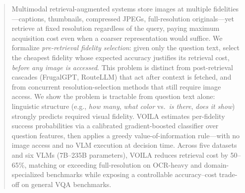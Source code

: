 \begin{abstract}
Multimodal retrieval-augmented systems store images at multiple fidelities---captions, thumbnails, compressed JPEGs, full-resolution originals---yet retrieve at fixed resolution regardless of the query, paying maximum acquisition cost even when a coarser representation would suffice.
We formalize \emph{pre-retrieval fidelity selection}: given only the question text, select the cheapest fidelity whose expected accuracy justifies its retrieval cost, \emph{before any image is accessed}.
This problem is distinct from post-retrieval cascades (FrugalGPT, RouteLLM) that act after context is fetched, and from concurrent resolution-selection methods that still require image access.
We show the problem is tractable from question text alone: linguistic structure (e.g., \emph{how many}, \emph{what color} vs.\ \emph{is there}, \emph{does it show}) strongly predicts required visual fidelity.
\textsc{VOILA} estimates per-fidelity success probabilities via a calibrated gradient-boosted classifier over question features, then applies a greedy value-of-information rule---with no image access and no VLM execution at decision time.
Across five datasets and six VLMs (7B--235B parameters), \textsc{VOILA} reduces retrieval cost by 50--65\%, matching or exceeding full-resolution on OCR-heavy and domain-specialized benchmarks while exposing a controllable accuracy--cost trade-off on general VQA benchmarks.


\end{abstract}
